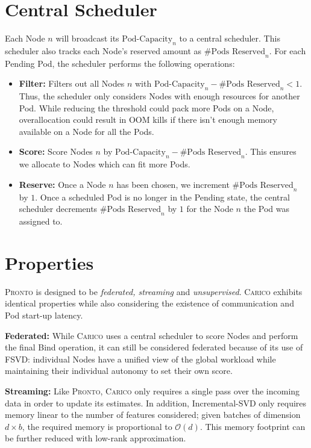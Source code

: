 \section{Central Scheduler}
Each Node $n$ will broadcast its $\text{Pod-Capacity}_n$ to a central scheduler. This
scheduler also tracks each Node's reserved amount as $\text{\# Pods Reserved}_n$. For
each Pending Pod, the scheduler performs the following operations:
\begin{itemize}
    \item \textbf{Filter:} Filters out all Nodes $n$ with $\text{Pod-Capacity}_n -
        \text{\# Pods Reserved}_n < 1$. Thus, the scheduler only considers Nodes
        with enough resources for another Pod. While reducing the threshold
        could pack more Pods on a Node, overallocation could result in OOM kills
        if there isn't enough memory available on a Node for all the Pods.
    \item \textbf{Score:} Score Nodes $n$ by $\text{Pod-Capacity}_n - \text{\#
        Pods Reserved}_n$. This ensures we allocate to Nodes which can fit more
        Pods.
    \item \textbf{Reserve:} Once a Node $n$ has been chosen, we increment
        $\text{\# Pods Reserved}_n$ by $1$. Once a scheduled Pod
        is no longer in the Pending state, the central scheduler decrements
        $\text{\# Pods Reserved}_n$ by $1$ for the Node $n$ the Pod was assigned
        to.
\end{itemize}

\section{Properties}
\textsc{Pronto} is designed to be \textit{federated, streaming} and
\textit{unsupervised}. \textsc{Carico} exhibits identical properties while also
considering the existence of communication and Pod start-up latency.

\textbf{Federated:}
While \textsc{Carico} uses a central scheduler to score Nodes and perform the final
Bind operation, it can still be considered federated because of its use
of FSVD: individual Nodes have a unified view of the global workload
while maintaining their individual autonomy to set their own score.

\textbf{Streaming:} Like \textsc{Pronto}, \textsc{Carico} only requires a single
pass over the incoming data in order to update its estimates. In addition,
Incremental-SVD only requires memory linear to the number of features
considered; given batches of dimension $d \times b$, the required memory is
proportional to $\mathcal{O}(d)$. This memory footprint can be further reduced
with low-rank approximation.

